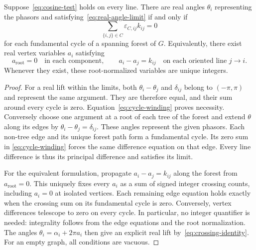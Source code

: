 \begin{lemma}
\label{lem:lift}
Suppose~\eqref{eq:cosine-test} holds on every line. There are real angles
$\theta_i$ representing the phasors and satisfying~\eqref{eq:real-angle-limit}
if and only if
\begin{equation}
 \sum_{\{i,j\}\in C}\varepsilon_{C,ij}k_{ij}=0
 \label{eq:zero-winding}
\end{equation}
for each fundamental cycle of a spanning forest of $G$.
Equivalently, there exist real vertex variables $a_i$ satisfying
\begin{equation}
 a_{\mathrm{root}}=0\quad\text{in each component},\qquad
 a_i-a_j=k_{ij}\quad\text{on each oriented line }j\to i.
 \label{eq:winding-potentials}
\end{equation}
Whenever they exist, these root-normalized variables are unique integers.
\end{lemma}
\begin{proof}
For a real lift within the limits, both $\theta_i-\theta_j$ and
$\delta_{ij}$ belong to $(-\pi,\pi)$ and represent the same argument.
They are therefore equal, and their sum around every cycle is zero.
Equation~\eqref{eq:cycle-winding} proves necessity.
Conversely choose one argument at a root of each tree of the forest and
extend $\theta$ along its edges by $\theta_i-\theta_j=\delta_{ij}$.
These angles represent the given phasors. Each non-tree edge and its
unique forest path form a fundamental cycle. Its zero sum in
\eqref{eq:cycle-winding} forces the same difference equation on that edge.
Every line difference is thus its principal difference and satisfies its limit.

For the equivalent formulation, propagate $a_i-a_j=k_{ij}$ along the
forest from $a_{\mathrm{root}}=0$. This uniquely fixes every $a_i$ as a
sum of signed integer crossing counts, including $a_i=0$ at isolated
vertices. Each remaining edge equation holds exactly when the crossing
sum on its fundamental cycle is zero. Conversely, vertex differences
telescope to zero on every cycle. In particular, no integer quantifier
is needed: integrality follows from the edge equations and the root
normalization. The angles $\theta_i=\alpha_i+2\pi a_i$ then give an
explicit real lift by~\eqref{eq:crossing-identity}. For an empty graph,
all conditions are vacuous.
\end{proof}

